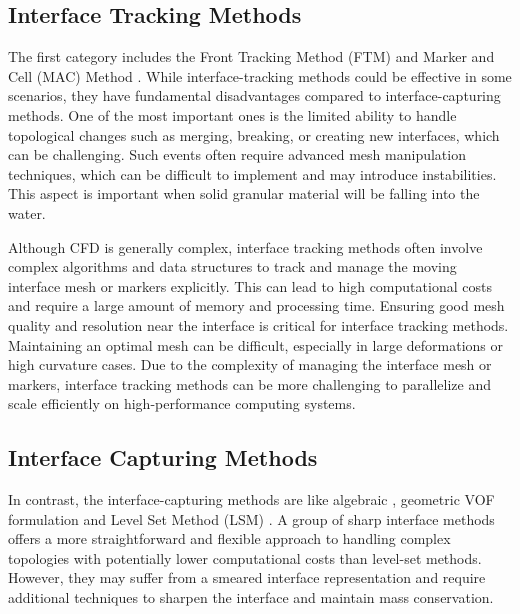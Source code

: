 \subsection{Interface Tracking Methods}

The first category includes the Front Tracking Method (\ac{FTM})\cite{front-tracking} and Marker and Cell (\ac{MAC}) Method \cite{mac}. While interface-tracking methods could be effective in some scenarios, they have fundamental disadvantages compared to interface-capturing methods. One of the most important ones is the limited ability to handle topological changes such as merging, breaking, or creating new interfaces, which can be challenging. Such events often require advanced mesh manipulation techniques, which can be difficult to implement and may introduce instabilities. This aspect is important when solid granular material will be falling into the water.

Although \ac{CFD} is generally complex, interface tracking methods often involve complex algorithms and data structures to track and manage the moving interface mesh or markers explicitly. This can lead to high computational costs and require a large amount of memory and processing time.
Ensuring good mesh quality and resolution near the interface is critical for interface tracking methods. Maintaining an optimal mesh can be difficult, especially in large deformations or high curvature cases. Due to the complexity of managing the interface mesh or markers, interface tracking methods can be more challenging to parallelize and scale efficiently on high-performance computing systems.

\subsection{Interface Capturing Methods}

In contrast, the interface-capturing methods are like algebraic \cite{algebraicVOF}, geometric VOF \cite{roenby2019isoadvector} formulation and Level Set Method (\ac{LSM}) \cite{VOF_level_set}. A group of sharp interface methods \cite{sharp-interface} offers a more straightforward and flexible approach to handling complex topologies with potentially lower computational costs than level-set methods. However, they may suffer from a smeared interface representation and require additional techniques to sharpen the interface and maintain mass conservation.

